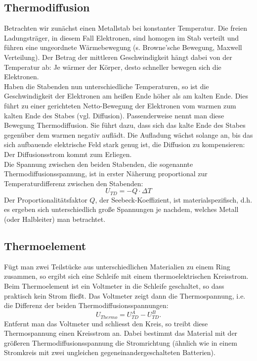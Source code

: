 \subsection{Thermodiffusion}

Betrachten wir zunächst einen Metallstab bei konstanter Temperatur. Die freien Ladungsträger, in diesem Fall Elektronen, sind homogen im Stab verteilt und führen eine ungeordnete Wärmebewegung (s. Browne'sche Bewegung, Maxwell Verteilung). Der Betrag der mittleren Geschwindigkeit hängt dabei von der Temperatur ab: Je wärmer der Körper, desto schneller bewegen sich die Elektronen.\\
Haben die Stabenden nun unterschiedliche Temperaturen, so ist die Geschwindigkeit der Elektronen am heißen Ende höher als am kalten Ende. Dies führt zu einer gerichteten Netto-Bewegung der Elektronen vom warmen zum kalten Ende des Stabes (vgl. Diffusion). Passenderweise nennt man diese Bewegung Thermodiffusion. Sie führt dazu, dass sich das kalte Ende des Stabes gegenüber dem warmen negativ auflädt. Die Aufladung wächst solange an, bis das sich aufbauende elektrische Feld stark genug ist, die Diffusion zu kompensieren: Der Diffusionsstrom kommt zum Erliegen.\\
Die Spannung zwischen den beiden Stabenden, die sogenannte Thermodiffusionsspannung, ist in erster Näherung proportional zur Temperaturdifferenz zwischen den Stabenden:
\begin{equation}
	U_{TD} = -Q\cdot \Delta T
\end{equation}
Der Proportionalitätsfaktor $Q$, der Seebeck-Koeffizient, ist materialspezifisch, d.h. es ergeben sich unterschiedlich große Spannungen je nachdem, welches Metall (oder Halbleiter) man betrachtet.

\subsection{Thermoelement}

Fügt man zwei Teilstücke aus unterschiedlichen Materialien zu einem Ring zusammen, so ergibt sich eine Schleife mit einem thermoelektrischen Kreisstrom. Beim Thermoelement ist ein Voltmeter in die Schleife geschaltet, so dass praktisch kein Strom fließt. Das Voltmeter zeigt dann die Thermospannung, i.e. die Differenz der beiden Thermodiffusionsspannungen:
\begin{equation}
	U_{Thermo} = U^A_{TD} - U^B_{TD}.
\end{equation}
Entfernt man das Voltmeter und schliesst den Kreis, so treibt diese Thermospannung einen Kreisstrom an. Dabei bestimmt das Material mit der größeren Thermodiffusionsspannung die Stromrichtung (ähnlich wie in einem Stromkreis mit zwei ungleichen gegeneinandergeschalteten Batterien).

